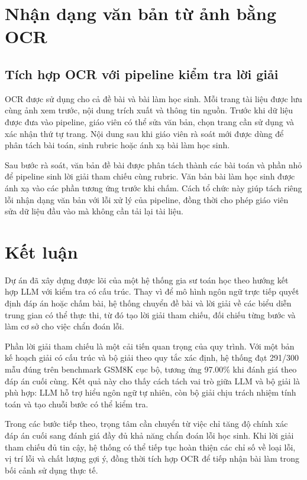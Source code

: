\documentclass[12pt,a4paper]{article}
\begin{document}
\section{Nhận dạng văn bản từ ảnh bằng OCR}



\subsection{Tích hợp OCR với pipeline kiểm tra lời giải}



OCR được sử dụng cho cả đề bài và bài làm học sinh. Mỗi trang tài liệu được lưu
cùng ảnh xem trước, nội dung trích xuất và thông tin nguồn. Trước khi dữ liệu được
đưa vào pipeline, giáo viên có thể sửa văn bản, chọn trang cần sử dụng và xác nhận
thứ tự trang. Nội dung sau khi giáo viên rà soát mới được dùng để phân tách bài toán,
sinh rubric hoặc ánh xạ bài làm học sinh.

Sau bước rà soát, văn bản đề bài được phân tách thành các bài toán và phần nhỏ để
pipeline sinh lời giải tham chiếu cùng rubric. Văn bản bài làm học sinh được ánh xạ
vào các phần tương ứng trước khi chấm. Cách tổ chức này giúp tách riêng lỗi nhận
dạng văn bản với lỗi xử lý của pipeline, đồng thời cho phép giáo viên sửa dữ liệu
đầu vào mà không cần tải lại tài liệu.



\section{Kết luận}

Dự án đã xây dựng được lõi của một hệ thống gia sư toán học theo hướng kết hợp
LLM với kiểm tra có cấu trúc. Thay vì để mô hình ngôn ngữ trực tiếp quyết định
đáp án hoặc chấm bài, hệ thống chuyển đề bài và lời giải về các biểu diễn trung
gian có thể thực thi, từ đó tạo lời giải tham chiếu, đối chiếu từng bước và làm
cơ sở cho việc chẩn đoán lỗi.

Phần lời giải tham chiếu là một cải tiến quan trọng của quy trình. Với một bản
kế hoạch giải có cấu trúc và bộ giải theo quy tắc xác định, hệ thống đạt 291/300
mẫu đúng trên benchmark GSM8K cục bộ, tương ứng 97.00\% khi đánh giá theo đáp án
cuối cùng. Kết quả này cho thấy cách tách vai trò giữa LLM và bộ giải là phù hợp:
LLM hỗ trợ hiểu ngôn ngữ tự nhiên, còn bộ giải chịu trách nhiệm tính toán và tạo
chuỗi bước có thể kiểm tra.

Trong các bước tiếp theo, trọng tâm cần chuyển từ việc chỉ tăng độ chính xác đáp
án cuối sang đánh giá đầy đủ khả năng chẩn đoán lỗi học sinh. Khi lời giải tham
chiếu đủ tin cậy, hệ thống có thể tiếp tục hoàn thiện các chỉ số về loại lỗi, vị
trí lỗi và chất lượng gợi ý, đồng thời tích hợp OCR để tiếp nhận bài làm trong
bối cảnh sử dụng thực tế.
\end{document}
